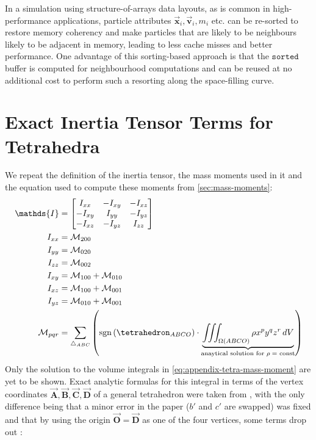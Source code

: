 \documentclass[oneside, a4paper]{book}
\newcommand\vek[1]{\vec{\bm{#1}}}
\newcommand\br[1]{\left(#1\right)}
\DeclareMathOperator{\sgn}{sgn}
\begin{document}
\begin{appendices}
    In a simulation using structure-of-arrays data layouts, as is common in high-performance applications, particle attributes $\vek{x}_i, \vek{v}_i, m_i$ etc. can be re-sorted to restore memory coherency and make particles that are likely to be neighbours likely to be adjacent in memory, leading to less cache misses and better performance. One advantage of this sorting-based approach is that the $\texttt{sorted}$ buffer is computed for neighbourhood computations and can be reused at no additional cost to perform such a resorting along the space-filling curve.

  \chapter{Exact Inertia Tensor Terms for Tetrahedra}\label{chp:analytic-tetrahedron-inertia}
  We repeat the definition of the inertia tensor, the mass moments used in it and the equation used to compute these moments from \autoref{sec:mass-moments}:
  \begin{align}
    \mathds{I} &= \begin{bmatrix}
      I_{xx}&-I_{xy}&-I_{xz}\\
      -I_{xy}&I_{yy}&-I_{yz}\\
      -I_{xz}&-I_{yz}&I_{zz}
    \end{bmatrix}\\
    I_{xx} &= \mathcal{M}_{200}\\
    I_{yy} &= \mathcal{M}_{020}\\
    I_{zz} &= \mathcal{M}_{002}\\
    I_{xy} &= \mathcal{M}_{100} + \mathcal{M}_{010}\\
    I_{xz} &= \mathcal{M}_{100} + \mathcal{M}_{001}\\
    I_{yz} &= \mathcal{M}_{010} + \mathcal{M}_{001}\\
    \mathcal{M}_{pqr} &= \sum_{\triangle_{ABC}} \br{\sgn\br{\tetrahedron_{ABCO}} \cdot \underbrace{\iiint_{\Omega\br{ABCO}} \rho x^p y^q z^r  \,dV}_{\text{anaytical solution for $\rho=$ const}}}\label{eq:appendix-tetra-mass-moment}
  \end{align}
  Only the solution to the volume integrals in \autoref{eq:appendix-tetra-mass-moment} are yet to be shown. Exact analytic formulas for this integral in terms of the vertex coordinates $\vek{A},\vek{B},\vek{C},\vek{D}$ of a general tetrahedron were taken from \autocite[Tonon]{explicit-exact-tetrahedron-formulas}, with the only difference being that a minor error in the paper ($b'$ and $c'$ are swapped) was fixed and that by using the origin $\vek{O} = \vek{D}$ as one of the four vertices, some terms drop out \autocite{explicit-exact-tetrahedron-formulas}:

\end{appendices}
\end{document}
